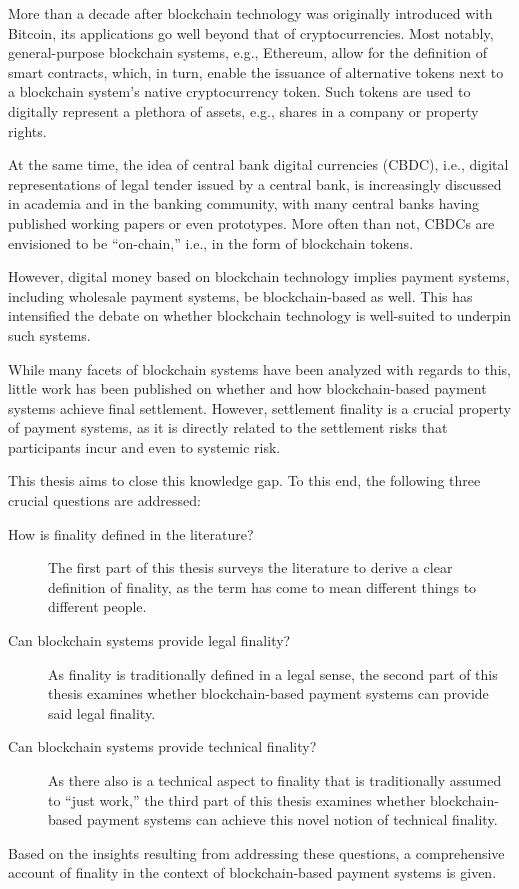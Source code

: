 More than a decade after blockchain technology was originally introduced with Bitcoin, its applications go well beyond that of cryptocurrencies.
Most notably, general-purpose blockchain systems, e.g., Ethereum, allow for the definition of smart contracts, which, in turn, enable the issuance of alternative tokens next to a blockchain system's native cryptocurrency token.
Such tokens are used to digitally represent a plethora of assets, e.g., shares in a company or property rights.

At the same time, the idea of central bank digital currencies (CBDC), i.e., digital representations of legal tender issued by a central bank, is increasingly discussed in academia and in the banking community, with many central banks having published working papers or even prototypes.
More often than not, CBDCs are envisioned to be ``on-chain,'' i.e., in the form of blockchain tokens.

However, digital money based on blockchain technology implies payment systems, including wholesale payment systems, be blockchain-based as well.
This has intensified the debate on whether blockchain technology is well-suited to underpin such systems.

While many facets of blockchain systems have been analyzed with regards to this, little work has been published on whether and how blockchain-based payment systems achieve final settlement.
However, settlement finality is a crucial property of payment systems, as it is directly related to the settlement risks that participants incur and even to systemic risk.

This thesis aims to close this knowledge gap.
To this end, the following three crucial questions are addressed:

\begin{description}
\item[How is finality defined in the literature?]
The first part of this thesis surveys the literature to derive a clear definition of finality, as the term has come to mean different things to different people.
\item[Can blockchain systems provide legal finality?]
As finality is traditionally defined in a legal sense, the second part of this thesis examines whether blockchain-based payment systems can provide said legal finality.
\item[Can blockchain systems provide technical finality?]
As there also is a technical aspect to finality that is traditionally assumed to ``just work,'' the third part of this thesis examines whether blockchain-based payment systems can achieve this novel notion of technical finality.
\end{description}

Based on the insights resulting from addressing these questions, a comprehensive account of finality in the context of blockchain-based payment systems is given.
